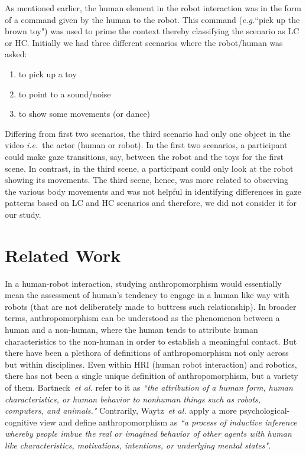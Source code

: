 \documentclass[a4,twocolumn,10pt]{article}
\newcommand{\eg}{{\textit{e.g.\xspace}}}
\newcommand{\etal}{{\textit{et al.\xspace}}}
\newcommand{\ie}{{\textit{i.e.\xspace}}}
\begin{document}
As mentioned earlier, the human element in the robot interaction was in
the form of a command given by the human to the
robot. This command (\eg ``pick up the brown toy") was used to prime
the context thereby classifying the scenario as LC or HC. Initially we had three
different scenarios where the robot/human was asked:

\begin{enumerate}
    \item to pick up a toy
    \item to point to a sound/noise
    \item to show some movements (or dance)
\end{enumerate}

Differing from first two scenarios, the third scenario had only one object in
the video \ie~the actor (human or robot). In the first two scenarios, a
participant could make gaze transitions, say, between the robot and the toys for
the first scene. In contrast, in the third scene, a participant could only look
at the robot showing its movements. The third scene, hence, was more related to
observing the various body movements and was not helpful in identifying
differences in gaze patterns based on LC and HC scenarios and therefore, we did
not consider it for our study.

\section{Related Work}
In a human-robot interaction, studying anthropomorphism would essentially mean
the assessment of human's tendency to engage in a human like way with robots
(that are not deliberately made to buttress such relationship). In broader
terms, anthropomorphism can be understood as the phenomenon between a human and
a non-human, where the human tends to attribute human characteristics to the
non-human in order to establish a meaningful contact\cite{fink2014dynamics}. But
there have been a plethora of definitions of anthropomorphism not only across
but within disciplines\cite{duffy_anthropomorphism_2002}. Even
within HRI (human robot interaction) and robotics, there has not been a single
unique definition of anthropomorphism, but a variety of them.
Bartneck~\etal\cite{bartneck_measurement_2008} refer to it as \emph{``the
attribution of a human form, human characteristics, or human behavior to
nonhuman things such as robots, computers, and animals."} Contrarily,
Waytz~\etal\cite{Waytz2010} apply a more psychological-cognitive view and
define anthropomorphism as \textit{``a process of inductive inference whereby
    people imbue the real or imagined behavior of other agents with human like
    characteristics, motivations, intentions, or underlying mental states".} 
\end{document}
